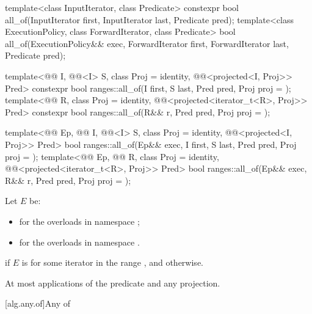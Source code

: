 %
\begin{itemdecl}
template<class InputIterator, class Predicate>
  constexpr bool all_of(InputIterator first, InputIterator last, Predicate pred);
template<class ExecutionPolicy, class ForwardIterator, class Predicate>
  bool all_of(ExecutionPolicy&& exec, ForwardIterator first, ForwardIterator last,
              Predicate pred);

template<@@ I, @@<I> S, class Proj = identity,
         @@<projected<I, Proj>> Pred>
  constexpr bool ranges::all_of(I first, S last, Pred pred, Proj proj = {});
template<@@ R, class Proj = identity,
         @@<projected<iterator_t<R>, Proj>> Pred>
  constexpr bool ranges::all_of(R&& r, Pred pred, Proj proj = {});

template<@@ Ep, @@ I, @@<I> S,
         class Proj = identity, @@<projected<I, Proj>> Pred>
  bool ranges::all_of(Ep&& exec, I first, S last, Pred pred, Proj proj = {});
template<@@ Ep, @@ R, class Proj = identity,
         @@<projected<iterator_t<R>, Proj>> Pred>
  bool ranges::all_of(Ep&& exec, R&& r, Pred pred, Proj proj = {});
\end{itemdecl}

\begin{itemdescr}
\pnum
Let $E$ be:
\begin{itemize}
\item
   for the overloads in namespace ;
\item
  for the overloads in namespace .
\end{itemize}

\pnum
\returns
{} if $E$ is 
for some iterator  in the range , and
 otherwise.

\pnum
\complexity
At most  applications of the predicate and any projection.
\end{itemdescr}

[alg.any.of]{Any of}

